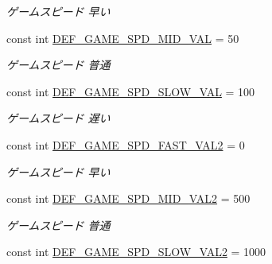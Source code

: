 \begin{DoxyCompactItemize}
\begin{DoxyCompactList}\small\item\em ゲームスピード 早い \end{DoxyCompactList}\item 
const int \hyperlink{class_reversi4color_wpf_1_1_reversi_const_a84f4f72020733f942ea368cababc7b32}{D\+E\+F\+\_\+\+G\+A\+M\+E\+\_\+\+S\+P\+D\+\_\+\+M\+I\+D\+\_\+\+V\+AL} = 50\hypertarget{class_reversi4color_wpf_1_1_reversi_const_a84f4f72020733f942ea368cababc7b32}{}\label{class_reversi4color_wpf_1_1_reversi_const_a84f4f72020733f942ea368cababc7b32}

\begin{DoxyCompactList}\small\item\em ゲームスピード 普通 \end{DoxyCompactList}\item 
const int \hyperlink{class_reversi4color_wpf_1_1_reversi_const_af848108f74a61b5cd2cd22c8f6845da6}{D\+E\+F\+\_\+\+G\+A\+M\+E\+\_\+\+S\+P\+D\+\_\+\+S\+L\+O\+W\+\_\+\+V\+AL} = 100\hypertarget{class_reversi4color_wpf_1_1_reversi_const_af848108f74a61b5cd2cd22c8f6845da6}{}\label{class_reversi4color_wpf_1_1_reversi_const_af848108f74a61b5cd2cd22c8f6845da6}

\begin{DoxyCompactList}\small\item\em ゲームスピード 遅い \end{DoxyCompactList}\item 
const int \hyperlink{class_reversi4color_wpf_1_1_reversi_const_afa20936d05a59898fe8a02b7ac8a74d7}{D\+E\+F\+\_\+\+G\+A\+M\+E\+\_\+\+S\+P\+D\+\_\+\+F\+A\+S\+T\+\_\+\+V\+A\+L2} = 0\hypertarget{class_reversi4color_wpf_1_1_reversi_const_afa20936d05a59898fe8a02b7ac8a74d7}{}\label{class_reversi4color_wpf_1_1_reversi_const_afa20936d05a59898fe8a02b7ac8a74d7}

\begin{DoxyCompactList}\small\item\em ゲームスピード 早い \end{DoxyCompactList}\item 
const int \hyperlink{class_reversi4color_wpf_1_1_reversi_const_aed6897e29a5bb4f3261d1caf0483feda}{D\+E\+F\+\_\+\+G\+A\+M\+E\+\_\+\+S\+P\+D\+\_\+\+M\+I\+D\+\_\+\+V\+A\+L2} = 500\hypertarget{class_reversi4color_wpf_1_1_reversi_const_aed6897e29a5bb4f3261d1caf0483feda}{}\label{class_reversi4color_wpf_1_1_reversi_const_aed6897e29a5bb4f3261d1caf0483feda}

\begin{DoxyCompactList}\small\item\em ゲームスピード 普通 \end{DoxyCompactList}\item 
const int \hyperlink{class_reversi4color_wpf_1_1_reversi_const_a2898d3054d49d92c7c3d8623bd9248d2}{D\+E\+F\+\_\+\+G\+A\+M\+E\+\_\+\+S\+P\+D\+\_\+\+S\+L\+O\+W\+\_\+\+V\+A\+L2} = 1000\hypertarget{class_reversi4color_wpf_1_1_reversi_const_a2898d3054d49d92c7c3d8623bd9248d2}{}\label{class_reversi4color_wpf_1_1_reversi_const_a2898d3054d49d92c7c3d8623bd9248d2}


\end{DoxyCompactItemize}
